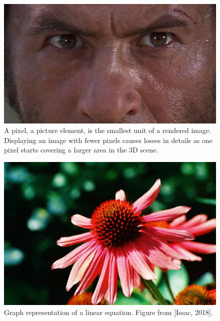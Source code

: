 \begin{figure}[ht]
  \centering

    \includegraphics[width=\linewidth]{Images/A scene from ‘The Good, the Bad and the Ugly’ (1966). Image courtesy- Produzioni Europee Associati .jpg}

   \caption{A pixel, a picture element, is the smallest unit of a rendered image. Displaying an image with fewer pixels causes losses in details as one pixel starts covering a larger area in the 3D scene.}
   \label{fig:colour-approximate}
\end{figure}


\begin{figure}
  \centering
   \includegraphics[width=\linewidth]{Images/byRickJones .jpg}
   
   \caption{Graph representation of a linear equation. Figure from [Issac, 2018].}
   \label{fig:neuron}
\end{figure}

